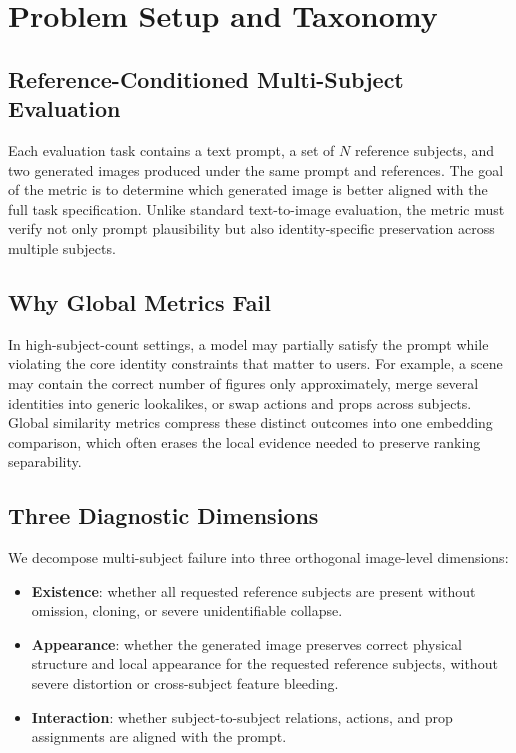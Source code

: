\section{Problem Setup and Taxonomy}

\subsection{Reference-Conditioned Multi-Subject Evaluation}
Each evaluation task contains a text prompt, a set of $N$ reference subjects, and two generated images produced under the same prompt and references. The goal of the metric is to determine which generated image is better aligned with the full task specification. Unlike standard text-to-image evaluation, the metric must verify not only prompt plausibility but also identity-specific preservation across multiple subjects.

\subsection{Why Global Metrics Fail}
In high-subject-count settings, a model may partially satisfy the prompt while violating the core identity constraints that matter to users. For example, a scene may contain the correct number of figures only approximately, merge several identities into generic lookalikes, or swap actions and props across subjects. Global similarity metrics compress these distinct outcomes into one embedding comparison, which often erases the local evidence needed to preserve ranking separability.

\subsection{Three Diagnostic Dimensions}
We decompose multi-subject failure into three orthogonal image-level dimensions:
\begin{itemize}
    \item \textbf{Existence}: whether all requested reference subjects are present without omission, cloning, or severe unidentifiable collapse.
    \item \textbf{Appearance}: whether the generated image preserves correct physical structure and local appearance for the requested reference subjects, without severe distortion or cross-subject feature bleeding.
    \item \textbf{Interaction}: whether subject-to-subject relations, actions, and prop assignments are aligned with the prompt.
\end{itemize}

